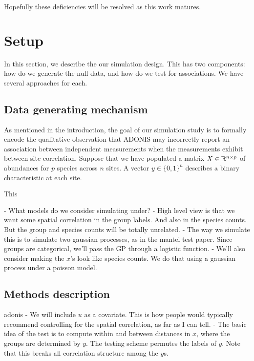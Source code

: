 \documentclass{article}
\begin{document}
Hopefully these deficiencies will be resolved as this work matures.

\section{Setup}
\label{sec:setup}

In this section, we describe the our simulation design. This has two components:
how do we generate the null data, and how do we test for associations. We have
several approaches for each.

\subsection{Data generating mechanism}
\label{subsec:data_generating_mechanism}

As mentioned in the introduction, the goal of our simulation study is to
formally encode the qualitative observation that ADONIS may incorrectly report
an association between independent measurements when the measurements exhibit
between-site correlation. Suppose that we have populated a matrix
$X \in \mathbb{R}^{n \times p}$ of abundances for $p$ species across $n$ sites. A vector
$y \in \{0, 1\}^{n}$ describes a binary characteristic at each site.

This 

- What models do we consider simulating under?
- High level view is that we want some spatial correlation in the group labels.
And also in the species counts. But the group and species counts will be totally
unrelated.
- The way we simulate this is to simulate two gaussian processes, as in the
mantel test paper. Since groups are categorical, we'll pass the GP through a
logistic function.
- We'll also consider making the $x$'s look like species counts. We do that
using a gaussian process under a poisson model.

\subsection{Methods description}
\label{subsec:methods_description}

adonis
- We will include $u$ as a covariate. This is how people would typically
recommend controlling for the spatial correlation, as far as I can tell.
- The basic idea of the test is to compute within and between distances in $x$,
where the groups are determined by $y$. The testing scheme permutes the labels
of $y$. Note that this breaks all correlation structure among the $y$s.
\end{document}
